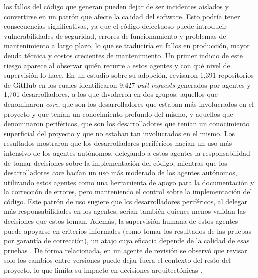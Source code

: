 los fallos del código que generan pueden dejar de ser incidentes aislados y convertirse en un patrón que afecte la calidad del software. Esto podría tener consecuencias significativas, ya que el código defectuoso puede introducir vulnerabilidades de seguridad, errores de funcionamiento y problemas de mantenimiento a largo plazo, lo que se traduciría en fallos en producción, mayor deuda técnica y costos crecientes de mantenimiento. Un primer indicio de este riesgo aparece al observar quién recurre a estos agentes y con qué nivel de supervisión lo hace. En un estudio sobre su adopción, \textcite{cynthia2026coreperipheral} revisaron 1,391 repositorios de GitHub en los cuales identificaron 9,427 \textit{pull requests} generados por agentes y 1,701 desarrolladores, a los que dividieron en dos grupos: aquellos que denominaron \textit{core}, que son los desarrolladores que estaban más involucrados en el proyecto y que tenían un conocimiento profundo del mismo, y aquellos que denominaron periféricos, que son los desarrolladores que tenían un conocimiento superficial del proyecto y que no estaban tan involucrados en el mismo. Los resultados mostraron que los desarrolladores periféricos hacían un uso más intensivo de los agentes autónomos, delegando a estos agentes la responsabilidad de tomar decisiones sobre la implementación del código, mientras que los desarrolladores \textit{core} hacían un uso más moderado de los agentes autónomos, utilizando estos agentes como una herramienta de apoyo para la documentación y la corrección de errores, pero manteniendo el control sobre la implementación del código. Este patrón de uso sugiere que los desarrolladores periféricos, al delegar más responsabilidades en los agentes, serían también quienes menos validan las decisiones que estos toman. Además, la supervisión humana de estos agentes puede apoyarse en criterios informales (como tomar los resultados de las pruebas por garantía de corrección), un atajo cuya eficacia depende de la calidad de esas pruebas \parencite{dhanorkar2026oversight}. De forma relacionada, en un agente de revisión se observó que revisar solo los cambios entre versiones puede dejar fuera el contexto del resto del proyecto, lo que limita su impacto en decisiones arquitectónicas \parencite{candido2026gandalf}.

